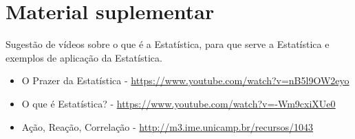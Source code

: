 \section{Material suplementar}
\label{\detokenize{PE103-A:material-suplementar}}\label{\detokenize{PE103-A:cap-materialsuplementar-referencias}}
Sugestão de vídeos sobre o que é a Estatística, para que serve a Estatística e exemplos de aplicação da Estatística.
\begin{itemize}
\item {} 
O Prazer da Estatística - \url{https://www.youtube.com/watch?v=nB5l9OW2eyo}

\item {} 
O que é Estatística? - \url{https://www.youtube.com/watch?v=-Wm9cxiXUe0}

\item {} 
Ação, Reação, Correlação - \url{http://m3.ime.unicamp.br/recursos/1043}

\end{itemize}

